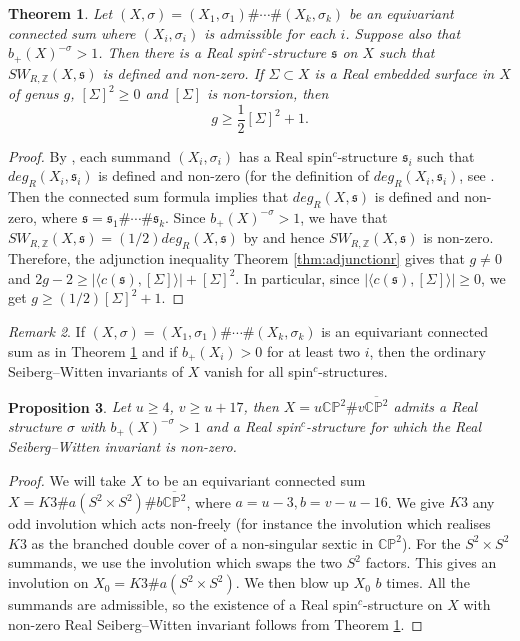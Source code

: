 \documentclass{amsart}
\newtheorem{theorem}{Theorem}[section]
\newtheorem{proposition}[theorem]{Proposition}
\theoremstyle{definition}
\theoremstyle{remark}
\newtheorem{remark}[theorem]{Remark}
\numberwithin{equation}{section}
\begin{document}
\begin{theorem}\label{thm:sumnonzero}
Let $(X,\sigma) = (X_1,\sigma_1) \# \cdots \# (X_k , \sigma_k)$ be an equivariant connected sum where $(X_i , \sigma_i)$ is admissible for each $i$. Suppose also that $b_+(X)^{-\sigma} > 1$. Then there is a Real spin$^c$-structure $\mathfrak{s}$ on $X$ such that $SW_{R,\mathbb{Z}}(X , \mathfrak{s})$ is defined and non-zero. If $\Sigma \subset X$ is a Real embedded surface in $X$ of genus $g$, $[\Sigma]^2 \ge 0$ and $[\Sigma]$ is non-torsion, then 
\[
g \ge \frac{1}{2}[\Sigma]^2 + 1.
\]
\end{theorem}
\begin{proof}
By \cite[Proposition 11.2]{bar3}, each summand $(X_i , \sigma_i)$ has a Real spin$^c$-structure $\mathfrak{s}_i$ such that $deg_R(X_i , \mathfrak{s}_i)$ is defined and non-zero (for the definition of $deg_R(X_i , \mathfrak{s}_i)$, see \cite[]{bar3}. Then the connected sum formula \cite[Theorem 1.11]{bar3} implies that $deg_R(X , \mathfrak{s})$ is defined and non-zero, where $\mathfrak{s} = \mathfrak{s}_1 \# \cdots \# \mathfrak{s}_k$. Since $b_+(X)^{-\sigma} > 1$, we have that $SW_{R,\mathbb{Z}}(X , \mathfrak{s}) = (1/2)deg_R(X,\mathfrak{s})$ by \cite[Proposition 1.9]{bar3} and hence $SW_{R,\mathbb{Z}}(X , \mathfrak{s})$ is non-zero. Therefore, the adjunction inequality Theorem \ref{thm:adjunctionr} gives that $g \neq 0$ and $2g-2 \ge |\langle c(\mathfrak{s}) , [\Sigma] \rangle | + [\Sigma]^2$. In particular, since $|\langle c(\mathfrak{s}) , [\Sigma] \rangle | \ge 0$, we get $g \ge (1/2)[\Sigma]^2 + 1$.
\end{proof}

\begin{remark}
If $(X,\sigma) = (X_1,\sigma_1) \# \cdots \# (X_k , \sigma_k)$ is an equivariant connected sum as in Theorem \ref{thm:sumnonzero} and if $b_+(X_i) > 0$ for at least two $i$, then the ordinary Seiberg--Witten invariants of $X$ vanish for all spin$^c$-structures.
\end{remark}

\begin{proposition}\label{prop:invol1}
Let $u \ge 4$, $v \ge u+17$, then $X = u \mathbb{CP}^2 \# v \overline{\mathbb{CP}^2}$ admits a Real structure $\sigma$ with $b_+(X)^{-\sigma} > 1$ and a Real spin$^c$-structure for which the Real Seiberg--Witten invariant is non-zero.
\end{proposition}
\begin{proof}
We will take $X$ to be an equivariant connected sum $X = K3 \# a(S^2 \times S^2) \# b \overline{\mathbb{CP}^2}$, where $a = u-3, b = v - u - 16$. We give $K3$ any odd involution which acts non-freely (for instance the involution which realises $K3$ as the branched double cover of a non-singular sextic in $\mathbb{CP}^2$). For the $S^2 \times S^2$ summands, we use the involution which swaps the two $S^2$ factors. This gives an involution on $X_0 = K3 \# a(S^2 \times S^2)$. We then blow up $X_0$ $b$ times. All the summands are admissible, so the existence of a Real spin$^c$-structure on $X$ with non-zero Real Seiberg--Witten invariant follows from Theorem \ref{thm:sumnonzero}.
\end{proof}
\end{document}
